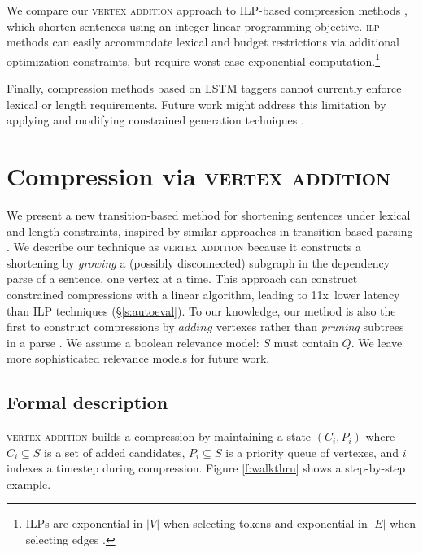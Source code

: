 \documentclass[11pt,a4paper]{article}
\newcommand{\speedup}[0]{11x~}
\begin{document}
We compare our \textsc{vertex addition} approach to ILP-based compression methods \cite{clarke2008global,filippova2013overcoming,Wang2017CanSH}, which shorten sentences using an integer linear programming objective. \textsc{ilp} methods can easily accommodate lexical and budget restrictions via additional optimization constraints, but require worst-case exponential computation.\footnote{ILPs are exponential in $|V|$ when selecting \cite{clarke2008global} tokens and exponential in $|E|$ when selecting edges \cite{filippova2015sentence}.} 

Finally, compression methods based on LSTM taggers \cite{filippova2015sentence} cannot currently enforce lexical or length requirements. Future work might address this limitation by applying and modifying constrained generation techniques \cite{D16-1140,N18-1119,D18-1443}.

\section{Compression via \textsc{vertex addition}}\label{s:system}

We present a new transition-based method for shortening sentences under lexical and length constraints, inspired by similar approaches in transition-based parsing \cite{nivre2003}. We describe our technique as \textsc{vertex addition} because it constructs a shortening by \textit{growing} a (possibly disconnected) subgraph in the dependency parse of a sentence, one vertex at a time. This approach can construct constrained compressions with a linear algorithm, leading to \speedup lower latency than ILP techniques (\S\ref{s:autoeval}). To our knowledge, our method is also the first to construct compressions by $\textit{adding}$ vertexes rather than \textit{pruning} subtrees in a parse \cite{Knight2000StatisticsBasedS,almeida2013fast,Filippova2015FastKS}. We assume a boolean relevance model: $S$ must contain $Q$. We leave more sophisticated relevance models for future work.

\subsection{Formal description}\label{s:formal}

\textsc{vertex addition} builds a compression by maintaining a state
$(C_i,P_i)$ where $C_i \subseteq S$ is a set of added candidates, $P_i  \subseteq S$ is a priority queue of vertexes, and $i$ indexes a timestep during compression. Figure \ref{f:walkthru} shows a step-by-step example. 
\end{document}
